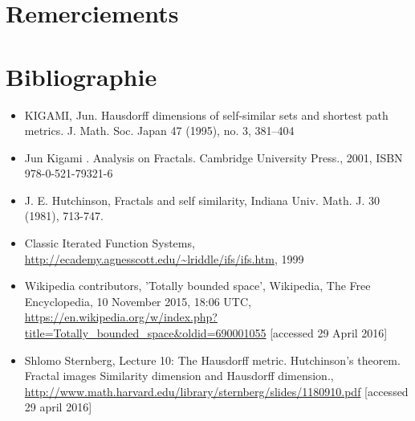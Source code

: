 \documentclass[a4paper, 12pt]{report}
\begin{document}
	\chapter*{Remerciements}
	
	
	\chapter*{Bibliographie}
		\begin{itemize}
			\setlength\itemsep{.5 cm}
			\item KIGAMI, Jun. Hausdorff dimensions of self-similar sets and shortest path metrics. J. Math. Soc. Japan 47 (1995), no. 3, 381--404
			
			\item Jun Kigami . Analysis on Fractals. Cambridge University Press., 2001, ISBN 978-0-521-79321-6
			
			\item J. E. Hutchinson, Fractals and self similarity, Indiana Univ. Math. J. 30 (1981), 713-747.

			\item Classic Iterated Function Systems, \url{http://ecademy.agnesscott.edu/~lriddle/ifs/ifs.htm}, 1999

			\item Wikipedia contributors, 'Totally bounded space', Wikipedia, The Free Encyclopedia, 10 November 2015, 18:06 UTC, \url{https://en.wikipedia.org/w/index.php?title=Totally_bounded_space&oldid=690001055} [accessed 29 April 2016]
			
			\item Shlomo Sternberg, Lecture 10: The Hausdorff metric. Hutchinson's theorem. Fractal images Similarity dimension and Hausdorff dimension., \url{http://www.math.harvard.edu/library/sternberg/slides/1180910.pdf} [accessed 29 april 2016]
		\end{itemize}
\end{document}
